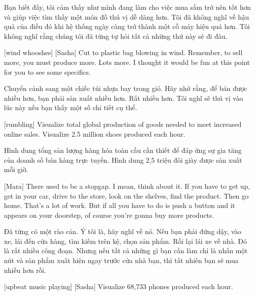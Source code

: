 \documentclass[a4paper]{article}
\begin{document}
	\begin{vietnamese-v2}
		Bạn biết đấy, tôi cảm thấy như mình đang làm cho việc mua sắm trở nên tốt hơn và giúp việc tìm thấy một món đồ thú vị dễ dàng hơn. 
		Tôi đã không nghĩ về hậu quả của điều đó khi hệ thống ngày càng trở thành một cỗ máy hiệu quả hơn. 
		Tôi không nghĩ rằng chúng tôi đã từng tự hỏi tất cả những thứ này sẽ đi đâu.
	\end{vietnamese-v2}
	
	[wind whooshes]
	[Sasha] Cut to plastic bag blowing in wind.
	Remember, to sell more, you must produce more.
	Lots more.
	I thought it would be fun at this point for you to see some specifics.
	
	\begin{vietnamese-v2}
		 Chuyển cảnh sang một chiếc túi nhựa bay trong gió. 
		Hãy nhớ rằng, để bán được nhiều hơn, bạn phải sản xuất nhiều hơn. 
		Rất nhiều hơn. 
		Tôi nghĩ sẽ thú vị vào lúc này nếu bạn thấy một số chi tiết cụ thể.
	\end{vietnamese-v2}
	
	[rumbling]
	Visualize total global production of goods needed to meet increased online sales.
	Visualize 2.5 million shoes produced each hour.
	
	\begin{vietnamese-v2}
		[tiếng ầm ầm] 
		Hình dung tổng sản lượng hàng hóa toàn cầu cần thiết để đáp ứng sự gia tăng của doanh số bán hàng trực tuyến. 
		Hình dung 2,5 triệu đôi giày được sản xuất mỗi giờ.
	\end{vietnamese-v2}
	
	[Mara] There used to be a stopgap. I mean, think about it.
	If you have to get up, get in your car, drive to the store, look on the shelves, find the product.
	Then go home.
	That's a lot of work.
	But if all you have to do is push a button and it appears on your doorstep, of course you're gonna buy more products.
	
	\begin{vietnamese-v2}
		[Mara] Đã từng có một rào cản. Ý tôi là, hãy nghĩ về nó. 
		Nếu bạn phải đứng dậy, vào xe, lái đến cửa hàng, tìm kiếm trên kệ, chọn sản phẩm. 
		Rồi lại lái xe về nhà. Đó là rất nhiều công đoạn. 
		Nhưng nếu tất cả những gì bạn cần làm chỉ là nhấn một nút và sản phẩm xuất hiện ngay trước cửa nhà bạn, thì tất nhiên bạn sẽ mua nhiều hơn rồi.
	\end{vietnamese-v2}
	
	[upbeat music playing]
	[Sasha] Visualize 68,733 phones produced each hour.
	
\end{document}

